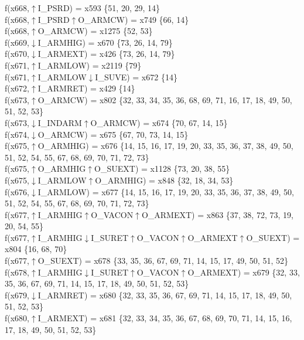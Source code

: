 f(x668,$\uparrow$I\_PSRD) = x593 \{51, 20, 29, 14\} \\  
f(x668,$\uparrow$I\_PSRD$\uparrow$O\_ARMCW) = x749 \{66, 14\} \\  
f(x668,$\uparrow$O\_ARMCW) = x1275 \{52, 53\} \\  
f(x669,$\downarrow$I\_ARMHIG) = x670 \{73, 26, 14, 79\} \\  
f(x670,$\downarrow$I\_ARMEXT) = x426 \{73, 26, 14, 79\} \\  
f(x671,$\uparrow$I\_ARMLOW) = x2119 \{79\} \\  
f(x671,$\uparrow$I\_ARMLOW$\downarrow$I\_SUVE) = x672 \{14\} \\  
f(x672,$\uparrow$I\_ARMRET) = x429 \{14\} \\  
f(x673,$\uparrow$O\_ARMCW) = x802 \{32, 33, 34, 35, 36, 68, 69, 71, 16, 17, 18, 49, 50, 51, 52, 53\} \\  
f(x673,$\downarrow$I\_INDARM$\uparrow$O\_ARMCW) = x674 \{70, 67, 14, 15\} \\  
f(x674,$\downarrow$O\_ARMCW) = x675 \{67, 70, 73, 14, 15\} \\  
f(x675,$\uparrow$O\_ARMHIG) = x676 \{14, 15, 16, 17, 19, 20, 33, 35, 36, 37, 38, 49, 50, 51, 52, 54, 55, 67, 68, 69, 70, 71, 72, 73\} \\  
f(x675,$\uparrow$O\_ARMHIG$\uparrow$O\_SUEXT) = x1128 \{73, 20, 38, 55\} \\  
f(x675,$\downarrow$I\_ARMLOW$\uparrow$O\_ARMHIG) = x848 \{32, 18, 34, 53\} \\  
f(x676,$\downarrow$I\_ARMLOW) = x677 \{14, 15, 16, 17, 19, 20, 33, 35, 36, 37, 38, 49, 50, 51, 52, 54, 55, 67, 68, 69, 70, 71, 72, 73\} \\  
f(x677,$\uparrow$I\_ARMHIG$\uparrow$O\_VACON$\uparrow$O\_ARMEXT) = x863 \{37, 38, 72, 73, 19, 20, 54, 55\} \\  
f(x677,$\uparrow$I\_ARMHIG$\downarrow$I\_SURET$\uparrow$O\_VACON$\uparrow$O\_ARMEXT$\uparrow$O\_SUEXT) = x804 \{16, 68, 70\} \\  
f(x677,$\uparrow$O\_SUEXT) = x678 \{33, 35, 36, 67, 69, 71, 14, 15, 17, 49, 50, 51, 52\} \\  
f(x678,$\uparrow$I\_ARMHIG$\downarrow$I\_SURET$\uparrow$O\_VACON$\uparrow$O\_ARMEXT) = x679 \{32, 33, 35, 36, 67, 69, 71, 14, 15, 17, 18, 49, 50, 51, 52, 53\} \\  
f(x679,$\downarrow$I\_ARMRET) = x680 \{32, 33, 35, 36, 67, 69, 71, 14, 15, 17, 18, 49, 50, 51, 52, 53\} \\  
f(x680,$\uparrow$I\_ARMEXT) = x681 \{32, 33, 34, 35, 36, 67, 68, 69, 70, 71, 14, 15, 16, 17, 18, 49, 50, 51, 52, 53\} \\  
